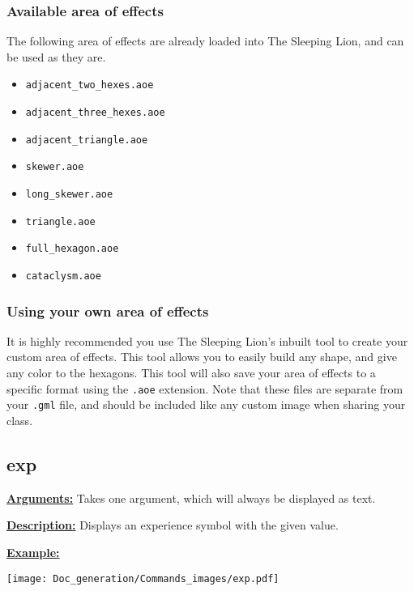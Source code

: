\documentclass{article}
\begin{document}
\subsubsection{Available area of effects}
The following area of effects are already loaded into The Sleeping Lion, and can be used as they are.
\begin{multicols}{2}
\begin{itemize}
\item \verb`adjacent_two_hexes.aoe`
\item \verb`adjacent_three_hexes.aoe`
\item \verb`adjacent_triangle.aoe`
\item \verb`skewer.aoe`
\item \verb`long_skewer.aoe`
\item \verb`triangle.aoe`
\item \verb`full_hexagon.aoe`
\item \verb`cataclysm.aoe`
\end{itemize}
\end{multicols}

\subsubsection{Using your own area of effects}
It is highly recommended you use The Sleeping Lion's inbuilt tool to create your custom area of effects. This tool allows you to easily build any shape, and give any color to the hexagons. This tool will also save your area of effects to a specific format using the \verb`.aoe` extension. Note that these files are separate from your \verb`.gml` file, and should be included like any custom image when sharing your class.

\subsection{exp}
\textbf{\underline{Arguments:}} Takes one argument, which will always be displayed as text.

\textbf{\underline{Description:}} Displays an experience symbol with the given value.

\textbf{\underline{Example:}}

\begin{minipage}{0.45\linewidth}
\raggedright
\begin{spverbatim}

\end{spverbatim}
\end{minipage}
\begin{minipage}{0.45\linewidth}
\raggedleft
\texttt{[image: Doc\_generation/Commands\_images/exp.pdf]}
\end{minipage} 
\end{document}
